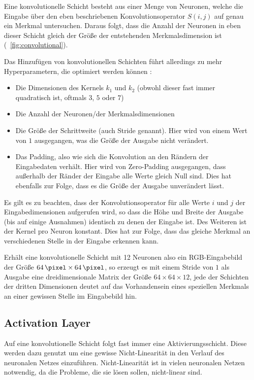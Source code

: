 Eine konvolutionelle Schicht besteht aus einer Menge von Neuronen, welche die Eingabe über den eben beschriebenen Konvolutionsoperator $S(i,j)$ auf genau ein Merkmal untersuchen. Daraus folgt, dass die Anzahl der Neuronen in eben dieser Schicht gleich der Größe der entstehenden Merkmalsdimension ist (\vgl \figurename~\ref{fig:convolutional}).

Das Hinzufügen von konvolutionellen Schichten führt allerdings zu mehr Hyperparametern, die optimiert werden können \cite{cs231n}:
\begin{itemize}
	\item Die Dimensionen des Kernels $k_1$ und $k_2$ (obwohl dieser fast immer quadratisch ist, oftmals $3$, $5$ oder $7$)
	\item Die Anzahl der Neuronen/der Merkmalsdimensionen
	\item Die Größe der Schrittweite (auch Stride genannt). Hier wird von einem Wert von $1$ ausgegangen, was die Größe der Ausgabe nicht verändert.
	\item Das Padding, also wie sich die Konvolution an den Rändern der Eingabedaten verhält. Hier wird von Zero-Padding ausgegangen, \dahe dass außerhalb der Ränder der Eingabe alle Werte gleich Null sind. Dies hat ebenfalls zur Folge, dass es die Größe der Ausgabe unverändert lässt.
\end{itemize}

Es gilt es zu beachten, dass der Konvolutionsoperator für alle Werte $i$ und $j$ der Eingabedimensionen aufgerufen wird, so dass die Höhe und Breite der Ausgabe (bis auf einige Ausnahmen) identisch zu denen der Eingabe ist.
Des Weiteren ist der Kernel pro Neuron konstant. Dies hat \ua zur Folge, dass das gleiche Merkmal an verschiedenen Stelle in der Eingabe erkennen kann.

Erhält eine konvolutionelle Schicht mit 12 Neuronen also \bspw ein RGB-Eingabebild der Größe $\SI{64}{\pixel}\times\SI{64}{\pixel}$, so erzeugt es mit einem Stride von $1$ als Ausgabe eine dreidimensionale Matrix der Größe $64\times64\times12$, jede der Schichten der dritten Dimensionen deutet auf das Vorhandensein eines speziellen Merkmals an einer gewissen Stelle im Eingabebild hin.

\subsection{Activation Layer}
\label{ssec:activation_layer}

Auf eine konvolutionelle Schicht folgt fast immer eine Aktivierungsschicht. Diese werden dazu genutzt um eine gewisse Nicht-Linearität in den Verlauf des neuronalen Netzes einzuführen. Nicht-Linearität ist in vielen neuronalen Netzen notwendig, da die Probleme, die sie lösen sollen, nicht-linear sind. \cite[Kap.~6]{deeplearning_16}

